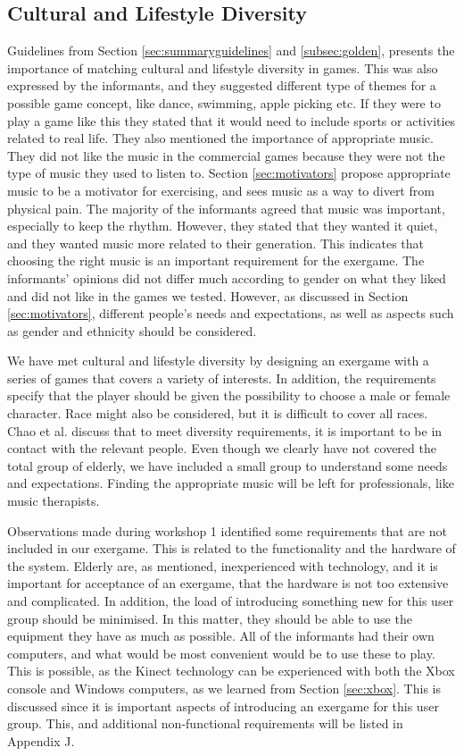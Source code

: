 \subsection{Cultural and Lifestyle Diversity}
Guidelines from Section \ref{sec:summaryguidelines} and \ref{subsec:golden}, presents the importance of matching cultural and lifestyle diversity in games. This was also expressed by the informants, and they suggested different type of themes for a possible game concept, like dance, swimming, apple picking etc. If they were to play a game like this they stated that it would need to include sports or activities related to real life. They also mentioned the importance of appropriate music. They did not like the music in the commercial games because they were not the type of music they used to listen to. Section \ref{sec:motivators} propose appropriate music to be a motivator for exercising, and \cite{schutzer} sees music as a way to divert from physical pain. The majority of the informants agreed that music was important, especially to keep the rhythm. However, they stated that they wanted it quiet, and they wanted music more related to their generation. This indicates that choosing the right music is an important requirement for the exergame. The informants' opinions did not differ much according to gender on what they liked and did not like in the games we tested. However, as discussed in Section \ref{sec:motivators}, different people's needs and expectations, as well as aspects such as gender and ethnicity should be considered. 

We have met cultural and lifestyle diversity by designing an exergame with a series of games that covers a variety of interests. In addition, the requirements specify that the player should be given the possibility to choose a male or female character. Race might also be considered, but it is difficult to cover all races. Chao et al. \cite{chao} discuss that to meet diversity requirements, it is important to be in contact with the relevant people. Even though we clearly have not covered the total group of elderly, we have included a small group to understand some needs and expectations. Finding the appropriate music will be left for professionals, like music therapists. 

Observations made during workshop 1 identified some requirements that are not included in our exergame. This is related to the functionality and the hardware of the system. Elderly are, as mentioned, inexperienced with technology, and it is important for acceptance of an exergame, that the hardware is not too extensive and complicated. In addition, the load of introducing something new for this user group should be minimised. In this matter, they should be able to use the equipment they have as much as possible. All of the informants had their own computers, and what would be most convenient would be to use these to play. This is possible, as the Kinect technology can be experienced with both the Xbox console and Windows computers, as we learned from Section \ref{sec:xbox}. This is discussed since it is important aspects of introducing an exergame for this user group. This, and additional non-functional requirements will be listed in Appendix J.  

